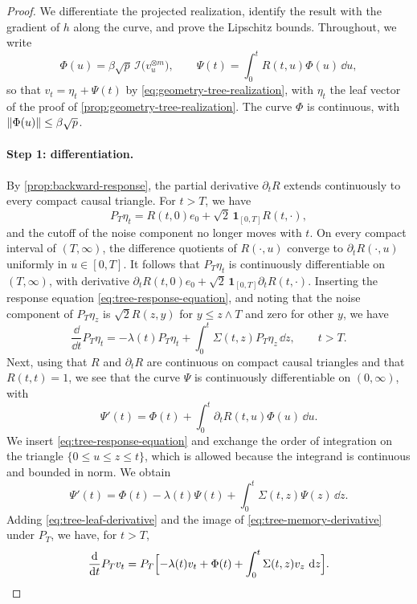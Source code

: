 \begin{proof}
We differentiate the projected realization, identify the result with the gradient of $h$ along the curve, and prove the Lipschitz bounds. Throughout, we write
\[
 \Phi(u)=\beta\sqrt p\,\mathcal I\bigl(v_u^{\otimes m}\bigr),\qquad
 \Psi(t)=\int_0^tR(t,u)\Phi(u)\,\dd u,
\]
so that $v_t=\eta_t+\Psi(t)$ by \eqref{eq:geometry-tree-realization}, with $\eta_t$ the leaf vector of the proof of \cref{prop:geometry-tree-realization}. The curve $\Phi$ is continuous, with $\lVert\Phi(u)\rVert\le\beta\sqrt p$.

\paragraph{Step 1: differentiation.}
By \cref{prop:backward-response}, the partial derivative $\partial_tR$ extends continuously to every compact causal triangle. For $t>T$, we have
\[
 P_T\eta_t=R(t,0)e_0+\sqrt2\,\mathbf 1_{[0,T]}R(t,\cdot),
\]
and the cutoff of the noise component no longer moves with $t$. On every compact interval of $(T,\infty)$, the difference quotients of $R(\cdot,u)$ converge to $\partial_tR(\cdot,u)$ uniformly in $u\in[0,T]$. It follows that $P_T\eta_t$ is continuously differentiable on $(T,\infty)$, with derivative $\partial_tR(t,0)e_0+\sqrt2\,\mathbf 1_{[0,T]}\partial_tR(t,\cdot)$. Inserting the response equation \eqref{eq:tree-response-equation}, and noting that the noise component of $P_T\eta_z$ is $\sqrt2R(z,y)$ for $y\le z\wedge T$ and zero for other $y$, we have
\begin{equation}\label{eq:tree-leaf-derivative}
 \frac{\dd}{\dd t}P_T\eta_t=-\lambda(t)P_T\eta_t+\int_0^t\Sigma(t,z)P_T\eta_z\,\dd z,\qquad t>T.
\end{equation}
Next, using that $R$ and $\partial_tR$ are continuous on compact causal triangles and that $R(t,t)=1$, we see that the curve $\Psi$ is continuously differentiable on $(0,\infty)$, with
\[
 \Psi'(t)=\Phi(t)+\int_0^t\partial_tR(t,u)\Phi(u)\,\dd u.
\]
We insert \eqref{eq:tree-response-equation} and exchange the order of integration on the triangle $\{0\le u\le z\le t\}$, which is allowed because the integrand is continuous and bounded in norm. We obtain
\begin{equation}\label{eq:tree-memory-derivative}
 \Psi'(t)=\Phi(t)-\lambda(t)\Psi(t)+\int_0^t\Sigma(t,z)\Psi(z)\,\dd z.
\end{equation}
Adding \eqref{eq:tree-leaf-derivative} and the image of \eqref{eq:tree-memory-derivative} under $P_T$, we have, for $t>T$,
\begin{equation}\label{eq:tree-projected-derivative}
 \frac{\mathop{}\!\mathrm d}{\mathop{}\!\mathrm d t}P_Tv_t=P_T\Bigl[-\lambda(t)v_t+\Phi(t)+\int_0^t\Sigma(t,z)v_z\,\mathop{}\!\mathrm d z\Bigr].
\end{equation}


\end{proof}
